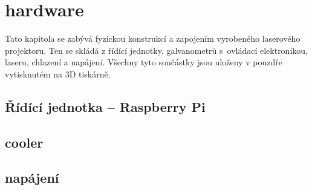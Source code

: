 \chapter{hardware}
Tato kapitola se zabývá fyzickou konstrukcí a zapojením vyrobeného laserového projektoru. Ten se skládá z řídící jednotky, galvanometrů s~ovládací elektronikou, laseru, chlazení a napájení. Všechny tyto součástky jsou uloženy v pouzdře vytisknutém na 3D tiskárně.

\section{Řídící jednotka -- Raspberry Pi}














\section{cooler}

\section{napájení}
